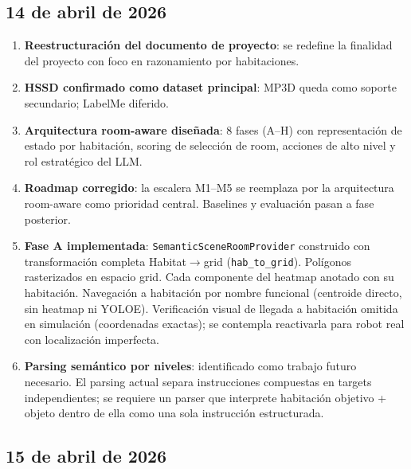 \documentclass[11pt,a4paper]{article}
\begin{document}
\subsection*{14 de abril de 2026}

\begin{enumerate}
  \item \textbf{Reestructuración del documento de proyecto}: se redefine la
        finalidad del proyecto con foco en razonamiento por habitaciones.
  \item \textbf{HSSD confirmado como dataset principal}: MP3D queda como soporte
        secundario; LabelMe diferido.
  \item \textbf{Arquitectura room-aware diseñada}: 8 fases (A--H) con
        representación de estado por habitación, scoring de selección de room,
        acciones de alto nivel y rol estratégico del LLM.
  \item \textbf{Roadmap corregido}: la escalera M1--M5 se reemplaza por la
        arquitectura room-aware como prioridad central. Baselines y evaluación
        pasan a fase posterior.
  \item \textbf{Fase A implementada}: \texttt{SemanticSceneRoomProvider} construido
        con transformación completa Habitat$\rightarrow$grid (\texttt{hab\_to\_grid}).
        Polígonos rasterizados en espacio grid. Cada componente del heatmap anotado
        con su habitación. Navegación a habitación por nombre funcional (centroide
        directo, sin heatmap ni YOLOE). Verificación visual de llegada a habitación
        omitida en simulación (coordenadas exactas); se contempla reactivarla para
        robot real con localización imperfecta.
  \item \textbf{Parsing semántico por niveles}: identificado como trabajo futuro
        necesario. El parsing actual separa instrucciones compuestas en targets
        independientes; se requiere un parser que interprete habitación objetivo +
        objeto dentro de ella como una sola instrucción estructurada.
\end{enumerate}

\subsection*{15 de abril de 2026}
\end{document}
